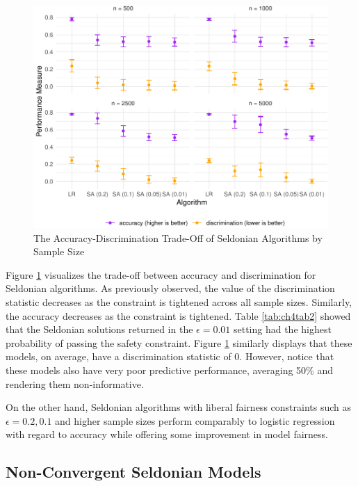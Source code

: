 \documentclass[12pt, twoside]{amherstthesis}
\begin{document}
\begin{figure}

{\centering \includegraphics{Dasha-Asienga_StatThesis_files/figure-latex/ch4fig4-1} 

}

\caption{The Accuracy-Discrimination Trade-Off of Seldonian Algorithms by Sample Size}\label{fig:ch4fig4}
\end{figure}
Figure \ref{fig:ch4fig4} visualizes the trade-off between accuracy and discrimination for Seldonian algorithms. As previously observed, the value of the discrimination statistic decreases as the constraint is tightened across all sample sizes. Similarly, the accuracy decreases as the constraint is tightened. Table \ref{tab:ch4tab2} showed that the Seldonian solutions returned in the \(\epsilon = 0.01\) setting had the highest probability of passing the safety constraint. Figure \ref{fig:ch4fig4} similarly displays that these models, on average, have a discrimination statistic of 0. However, notice that these models also have very poor predictive performance, averaging 50\% and rendering them non-informative.

On the other hand, Seldonian algorithms with liberal fairness constraints such as \(\epsilon = 0.2, 0.1\) and higher sample sizes perform comparably to logistic regression with regard to accuracy while offering some improvement in model fairness.

\hypertarget{non-convergent-seldonian-models}{%
\subsection{Non-Convergent Seldonian Models}\label{non-convergent-seldonian-models}}
\end{document}
